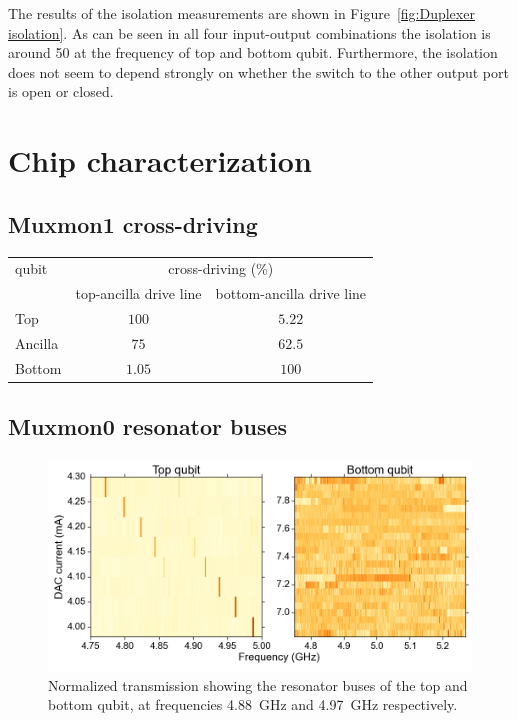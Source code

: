  The results of the isolation measurements are shown in Figure~\ref{fig:Duplexer isolation}. As can be seen in all four input-output combinations the isolation is around \SI{50}{\dBm} at the frequency of top and bottom qubit. Furthermore, the isolation does not seem to depend strongly on whether the switch to the other output port is open or closed.

\chapter{Chip characterization}

  \section{Muxmon1 cross-driving}
    \label{sec:Muxmon1 cross-driving}
      \begin{table}[h]
        \begin{tabular}{l c c}
          \toprule
          qubit & \multicolumn{2}{c}{cross-driving (\%)} \\
          \cmidrule(lr){2-3}
               & top-ancilla drive line & bottom-ancilla drive line \\
          \midrule
          Top     & $100$    & $5.22$ \\
          Ancilla & $75$ & $62.5$ \\
          Bottom  & $1.05$ & $100$    \\
          \bottomrule
        \end{tabular}
        \label{tab:Muxmon1 cross-driving}
      \end{table}

  \section{Muxmon0 resonator buses}
    \label{sec:Resonator buses}

    \begin{figure}[h]
      \centering
      \includegraphics[width=\textwidth]{../Figures/Appendix/resonator buses.png}
      \caption{Normalized transmission showing the resonator buses of the top and bottom qubit, at frequencies \SI{4.88}{\giga \hertz} and \SI{4.97}{\giga \hertz} respectively.}
      \label{fig:resonator buses}
    \end{figure}

